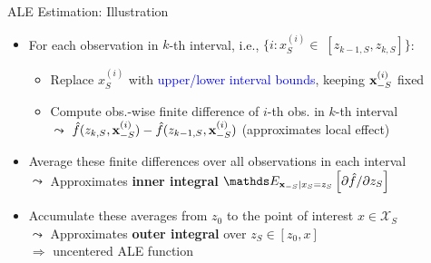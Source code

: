 \documentclass[10pt,compress,t,notes=noshow, xcolor=table]{beamer}
\begin{document}
\begin{frame}{ALE Estimation: Illustration}
\begin{itemize}
\item<1-> For each observation in $k$-th interval, i.e., $\{i: x_S^{(i)} \in \; [z_{k-1, S}, z_{k, S}]\}$:
  \begin{itemize}
    \item Replace $x_S^{(i)}$ with \textcolor{blue}{upper/lower interval bounds}, keeping $\mathbf{x}_{-S}^{(i)}$ fixed
    \item Compute obs.-wise finite difference of $i$-th obs. in $k$-th interval \\
    $\leadsto$ $\hat{f}(z_{k, S}, \mathbf{x}^{(i)}_{-S}) - \hat{f}(z_{k-1, S}, \mathbf{x}^{(i)}_{-S})$  \; (approximates local effect)  %
  \end{itemize}
\item<2-> Average these finite differences over all observations in each interval \\
$\leadsto$ Approximates \textbf{inner integral} \textcolor{red}{\( \E_{\xv_{-S} \mid x_S = z_S} \left[ \partial \hat{f}/\partial z_S \right] \)}
\item<2-> Accumulate these averages from \( z_0 \) to the point of interest \( x \in \mathcal{X}_S \) \\
$\leadsto$ Approximates \textbf{outer integral} over \( z_S \in [z_{0}, x] \) \\$\Rightarrow$ uncentered ALE function

\end{itemize}

\end{frame}


\end{document}
